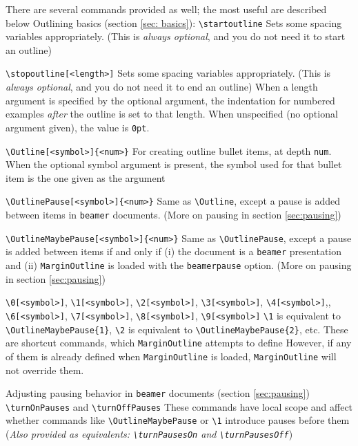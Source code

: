 \documentclass[11pt]{article}
\begin{document}
\0 There are several commands provided as well; the most useful are described below
\1 Outlining basics (section \ref{sec: basics}):
	\2 {\color{blue}\verb+\startoutline+}
		\3 Sets some spacing variables appropriately. (This is \textit{always optional}, and you do not need it to start an outline)

	\2 {\color{blue}\verb+\stopoutline[<length>]+}
		\3 Sets some spacing variables appropriately. (This is \textit{always optional}, and you do not need it to end an outline)
		\3 When a length argument is specified by the optional argument, the indentation for numbered examples \textit{after} the outline is set to that length.
		\3 When unspecified (no optional argument given), the value is \verb+0pt+.

	\2 {\color{blue}\verb+\Outline[<symbol>]{<num>}+}
		\3 For creating outline bullet items, at depth \verb+num+.
		\3 When the optional symbol argument is present, the symbol used for that bullet item is the one given as the argument

	\2 {\color{blue}\verb+\OutlinePause[<symbol>]{<num>}+}
		\3 Same as \verb+\Outline+, except a pause is added between items in \texttt{beamer} documents.
		\3 (More on pausing in section \ref{sec:pausing})

	\2 {\color{blue}\verb+\OutlineMaybePause[<symbol>]{<num>}+}
		\3 Same as \verb+\OutlinePause+, except a pause is added between items if and only if (i) the document is a \texttt{beamer} presentation and (ii) \verb+MarginOutline+ is loaded with the \verb+beamerpause+ option.
		\3 (More on pausing in section \ref{sec:pausing})

	\2 {\color{blue}\verb+\0[<symbol>]+}, {\color{blue}\verb+\1[<symbol>]+}, {\color{blue}\verb+\2[<symbol>]+}, {\color{blue}\verb+\3[<symbol>]+}, {\color{blue}\verb+\4[<symbol>]+},\newline {\color{blue}\verb+\5[<symbol>]+}, {\color{blue}\verb+\6[<symbol>]+}, {\color{blue}\verb+\7[<symbol>]+}, {\color{blue}\verb+\8[<symbol>]+}, {\color{blue}\verb+\9[<symbol>]+}
		\3 \verb+\1+ is equivalent to \verb+\OutlineMaybePause{1}+, \verb+\2+ is equivalent to \verb+\OutlineMaybePause{2}+, etc.
		\3 These are shortcut commands, which \verb+MarginOutline+ attempts to define
			\4 However, if any of them is already defined when \verb+MarginOutline+ is loaded, \verb+MarginOutline+ will not override them.


\1 Adjusting pausing behavior in \texttt{beamer} documents (section \ref{sec:pausing})
	\2 {\color{blue}\verb+\turnOnPauses+} and {\color{blue}\verb+\turnOffPauses+}
		\3 These commands have local scope and affect whether commands like \verb+\OutlineMaybePause+ or \verb+\1+ introduce pauses before them
		\3 ({\itshape{Also provided as equivalents: \color{blue}\verb+\turnPausesOn+} and {\color{blue}\verb+\turnPausesOff+}})
\end{document}
